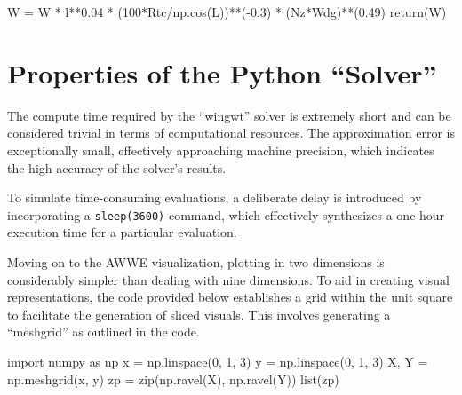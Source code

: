 \documentclass[
  letterpaper,
  DIV=11,
  numbers=noendperiod]{scrreprt}
\newenvironment{Shaded}{\begin{snugshade}}{\end{snugshade}}
\newcommand{\BuiltInTok}[1]{\textcolor[rgb]{0.00,0.23,0.31}{#1}}
\newcommand{\ControlFlowTok}[1]{\textcolor[rgb]{0.00,0.23,0.31}{#1}}
\newcommand{\DecValTok}[1]{\textcolor[rgb]{0.68,0.00,0.00}{#1}}
\newcommand{\FloatTok}[1]{\textcolor[rgb]{0.68,0.00,0.00}{#1}}
\newcommand{\ImportTok}[1]{\textcolor[rgb]{0.00,0.46,0.62}{#1}}
\newcommand{\NormalTok}[1]{\textcolor[rgb]{0.00,0.23,0.31}{#1}}
\newcommand{\OperatorTok}[1]{\textcolor[rgb]{0.37,0.37,0.37}{#1}}
\begin{document}
\begin{Shaded}
\begin{Highlighting}[]
\NormalTok{    W }\OperatorTok{=}\NormalTok{ W }\OperatorTok{*}\NormalTok{ l}\OperatorTok{**}\FloatTok{0.04} \OperatorTok{*}\NormalTok{ (}\DecValTok{100}\OperatorTok{*}\NormalTok{Rtc}\OperatorTok{/}\NormalTok{np.cos(L))}\OperatorTok{**}\NormalTok{(}\OperatorTok{{-}}\FloatTok{0.3}\NormalTok{) }\OperatorTok{*}\NormalTok{ (Nz}\OperatorTok{*}\NormalTok{Wdg)}\OperatorTok{**}\NormalTok{(}\FloatTok{0.49}\NormalTok{)}
    \ControlFlowTok{return}\NormalTok{(W)}
\end{Highlighting}
\end{Shaded}

\hypertarget{properties-of-the-python-solver}{%
\section{Properties of the Python
``Solver''}\label{properties-of-the-python-solver}}

The compute time required by the ``wingwt'' solver is extremely short
and can be considered trivial in terms of computational resources. The
approximation error is exceptionally small, effectively approaching
machine precision, which indicates the high accuracy of the solver's
results.

To simulate time-consuming evaluations, a deliberate delay is introduced
by incorporating a \texttt{sleep(3600)} command, which effectively
synthesizes a one-hour execution time for a particular evaluation.

Moving on to the AWWE visualization, plotting in two dimensions is
considerably simpler than dealing with nine dimensions. To aid in
creating visual representations, the code provided below establishes a
grid within the unit square to facilitate the generation of sliced
visuals. This involves generating a ``meshgrid'' as outlined in the
code.

\begin{Shaded}
\begin{Highlighting}[]
\ImportTok{import}\NormalTok{ numpy }\ImportTok{as}\NormalTok{ np}
\NormalTok{x }\OperatorTok{=}\NormalTok{ np.linspace(}\DecValTok{0}\NormalTok{, }\DecValTok{1}\NormalTok{, }\DecValTok{3}\NormalTok{)}
\NormalTok{y }\OperatorTok{=}\NormalTok{ np.linspace(}\DecValTok{0}\NormalTok{, }\DecValTok{1}\NormalTok{, }\DecValTok{3}\NormalTok{)}
\NormalTok{X, Y }\OperatorTok{=}\NormalTok{ np.meshgrid(x, y)}
\NormalTok{zp }\OperatorTok{=} \BuiltInTok{zip}\NormalTok{(np.ravel(X), np.ravel(Y))}
\BuiltInTok{list}\NormalTok{(zp)}
\end{Highlighting}
\end{Shaded}
\end{document}
